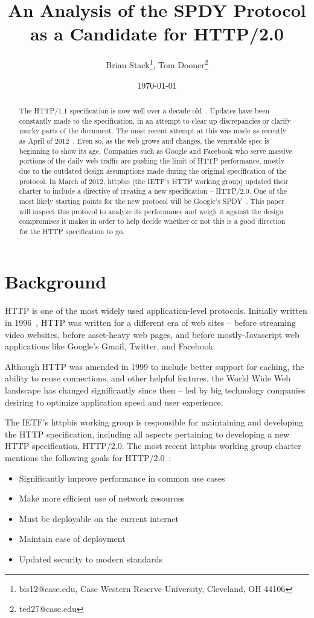 \documentclass[11pt,letterpaper,notitlepage]{article}
\title{An Analysis of the SPDY Protocol as a Candidate for HTTP/2.0}
\date{\today}
\author{Brian Stack\thanks{ bis12@case.edu, Case Western Reserve University,
Cleveland, OH 44106}, Tom Dooner\thanks{ ted27@case.edu }}
\begin{document}
\maketitle
\setcounter{tocdepth}{1}
\tableofcontents
\begin{abstract}
The HTTP/1.1 specification is now well over a decade old~\cite{rfc2616}. Updates
have been constantly made to the specification, in an attempt to clear up
discrepancies or clarify murky parts of the document.  The most recent attempt
at this was made as recently as April of 2012~\cite{rfc6585}.  Even so, as the web grows
and changes, the venerable spec is beginning to show its age.  Companies such as
Google and Facebook who serve massive portions of the daily web traffic are
pushing the limit of HTTP performance, mostly due to the outdated design
assumptions made during the original specification of the protocol.  In March of
2012, httpbis (the IETF's HTTP working group) updated their charter to
include a directive of creating a new specification -- HTTP/2.0.  One of the
most likely starting points for the new protocol will be Google's
SPDY~\cite{spdyspec}.  This paper will inspect this protocol to analyze its
performance and weigh it against the design compromises it makes in order to
help decide whether or not this is a good direction for the HTTP specification
to go.
\end{abstract}

\section{Background}
\label{sec:background}
HTTP is one of the most widely used application-level protocols. Initially
written in 1996~\cite{http1rfc}, HTTP was written for a different era of web
sites -- before streaming video websites, before asset-heavy web pages, and
before mostly-Javascript web applications like Google's Gmail, Twitter, and
Facebook.

Although HTTP was amended in 1999 to include better support for caching, the
ability to reuse connections, and other helpful features, the World Wide Web
landscape has changed significantly since then -- led by big technology
companies desiring to optimize application speed and user experience.

The IETF's httpbis working group is responsible for maintaining and developing
the HTTP specification, including all aspects pertaining to developing a new
HTTP specification, HTTP/2.0. The most recent httpbis working group charter
mentions the following goals for HTTP/2.0~\cite{httpbis-charter}:
\begin{itemize}
\item Significantly improve performance in common use cases
\item Make more efficient use of network resources
\item Must be deployable on the current internet
\item Maintain ease of deployment
\item Updated security to modern standards
\end{itemize}
\end{document}
